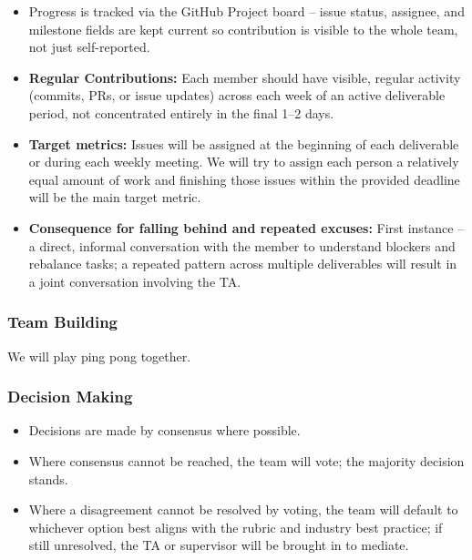 \documentclass{article}
\begin{document}
\begin{itemize}
    \item Progress is tracked via the GitHub Project board -- issue status,
          assignee, and milestone fields are kept current so contribution is
          visible to the whole team, not just self-reported.
    \item \textbf{Regular Contributions:} Each member should have visible, regular activity (commits, PRs, or issue updates) across each week of an active deliverable period, not concentrated entirely in the final 1--2 days.
    \item \textbf{Target metrics:} Issues will be assigned at the beginning of each deliverable or during each weekly meeting. We will try to assign each person a relatively equal amount of work and
          finishing those issues within the provided deadline will be the main target metric.
    \item \textbf{Consequence for falling behind and repeated excuses:} First instance -- a direct, informal conversation with the member to understand blockers and rebalance tasks; a repeated pattern across multiple deliverables will result in a joint conversation involving the TA.
\end{itemize}

\subsubsection*{Team Building}


We will play ping pong together.

\subsubsection*{Decision Making}


\begin{itemize}
    \item Decisions are made by consensus where possible.
    \item Where consensus cannot be reached, the team will vote; the majority
          decision stands.
    \item Where a disagreement cannot be resolved by voting, the team will
          default to whichever option best aligns with the rubric and industry
          best practice; if still unresolved, the TA or supervisor will be
          brought in to mediate.
\end{itemize}
\end{document}
